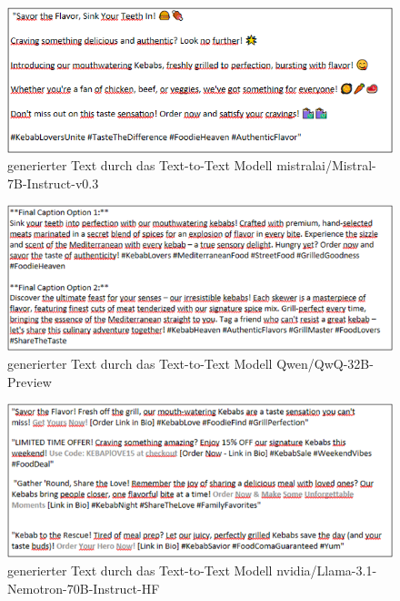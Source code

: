\clearpage

\begin{figure}[htbp]
    \centering
    \includegraphics[width=\textwidth]{abbildungen/textresult_mistral}
    \caption{generierter Text durch das Text-to-Text Modell mistralai/Mistral-7B-Instruct-v0.3}
    \label{fig:textresult_mistral}
\end{figure}

\begin{figure}[htbp]
    \centering
    \includegraphics[width=\textwidth]{abbildungen/textresult_Qwen}
    \caption{generierter Text durch das Text-to-Text Modell Qwen/QwQ-32B-Preview}
    \label{fig:textresult_Qwen}
\end{figure}

\clearpage

\begin{figure}[htbp]
    \centering
    \includegraphics[width=\textwidth]{abbildungen/textresult_nvdia_nemotron}
    \caption{generierter Text durch das Text-to-Text Modell nvidia/Llama-3.1-Nemotron-70B-Instruct-HF}
    \label{fig:textresult_nvdia_nemotron}
\end{figure}

